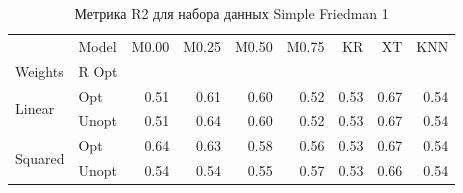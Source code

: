 \begin{table}
\caption{Метрика R2 для набора данных Simple Friedman 1}
\label{tab:R2_Simple Friedman 1}
\begin{tabular}{llrrrrrrr}
\toprule
 & Model & M0.00 & M0.25 & M0.50 & M0.75 & KR & XT & KNN \\
Weights & R Opt &  &  &  &  &  &  &  \\
\midrule
\multirow[t]{2}{*}{Linear} & Opt & 0.51 & 0.61 & 0.60 & 0.52 & 0.53 & 0.67 & 0.54 \\
 & Unopt & 0.51 & 0.64 & 0.60 & 0.52 & 0.53 & 0.67 & 0.54 \\

\multirow[t]{2}{*}{Squared} & Opt & 0.64 & 0.63 & 0.58 & 0.56 & 0.53 & 0.67 & 0.54 \\
 & Unopt & 0.54 & 0.54 & 0.55 & 0.57 & 0.53 & 0.66 & 0.54 \\

\bottomrule
\end{tabular}
\end{table}
